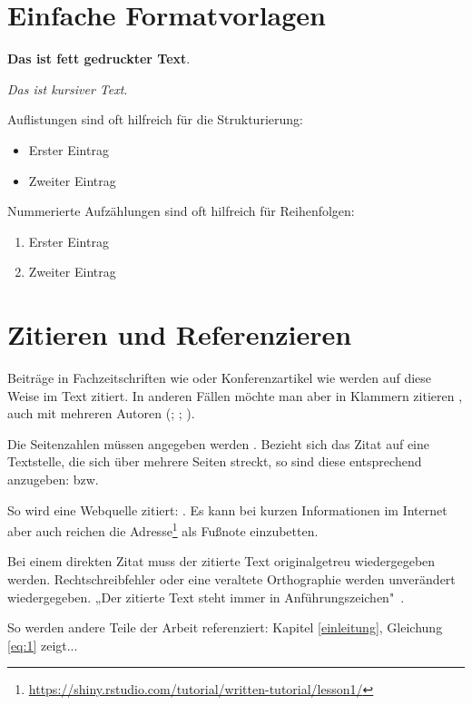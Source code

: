\section{Einfache Formatvorlagen}

\textbf{Das ist fett gedruckter Text}.

\textit{Das ist kursiver Text}.


Auflistungen sind oft hilfreich für die Strukturierung:
\begin{itemize}
    \item Erster Eintrag
    \item Zweiter Eintrag
\end{itemize}

Nummerierte Aufzählungen sind oft hilfreich für Reihenfolgen:
\begin{enumerate}
    \item Erster Eintrag
    \item Zweiter Eintrag
\end{enumerate}


\section{Zitieren und Referenzieren}

Beiträge in Fachzeitschriften wie \citet[12]{clemen1989combining} oder Konferenzartikel wie \citet[6]{he2017mask} werden auf diese Weise im Text zitiert. In anderen Fällen möchte man aber in Klammern zitieren \citep[10]{clemen1989combining}, auch mit mehreren Autoren (\citealp[3]{baumol1958warehouse}; \citealp[15]{clemen1989combining}; \citealp[12]{he2017mask}).

Die Seitenzahlen müssen angegeben werden \citep[28]{chollet2018deep}. Bezieht sich das Zitat auf eine Textstelle, die sich über mehrere Seiten streckt, so sind diese entsprechend anzugeben: \citet[28-29]{chollet2018deep} bzw. \citet[28-35]{chollet2018deep}

So wird eine Webquelle zitiert: \citet{shiny1}. Es kann bei kurzen Informationen im Internet aber auch reichen die Adresse\footnote{\url{https://shiny.rstudio.com/tutorial/written-tutorial/lesson1/}} als Fußnote einzubetten.

Bei einem direkten Zitat muss der zitierte Text originalgetreu wiedergegeben werden. Rechtschreibfehler oder eine veraltete Orthographie werden unverändert wiedergegeben. „Der zitierte Text steht immer in Anführungszeichen"\ \citep[28]{chollet2018deep}. 

So werden andere Teile der Arbeit referenziert: Kapitel \ref{einleitung}, Gleichung \ref{eq:1} zeigt...

